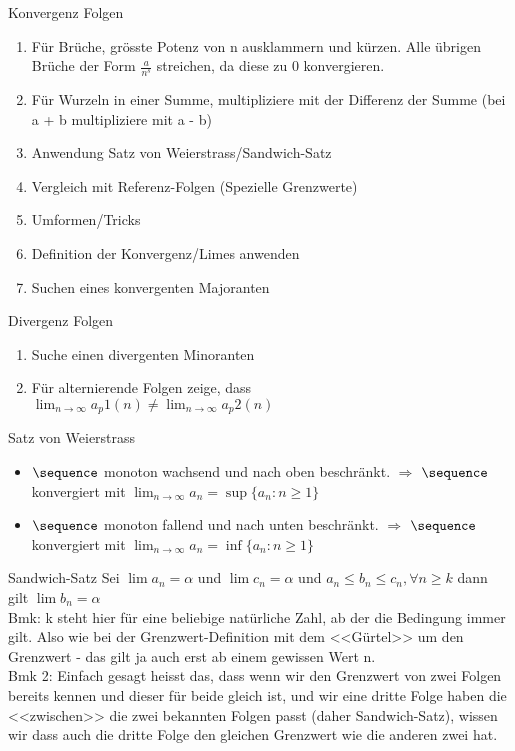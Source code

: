 \begin{KR}{Konvergenz Folgen}
  \begin{enumerate}
    \item Für Brüche, grösste Potenz von n ausklammern und kürzen. Alle übrigen Brüche der Form $\frac{a}{n^s}$ streichen, da diese zu 0 konvergieren.
    \item Für Wurzeln in einer Summe, multipliziere mit der Differenz der Summe (bei a + b multipliziere mit a - b)
    \item Anwendung Satz von Weierstrass/Sandwich-Satz 
    \item Vergleich mit Referenz-Folgen (Spezielle Grenzwerte)
    \item Umformen/Tricks
    \item Definition der Konvergenz/Limes anwenden
    \item Suchen eines konvergenten Majoranten
  \end{enumerate}
\end{KR}

\begin{KR}{Divergenz Folgen}
  \begin{enumerate}
    \item  Suche einen divergenten Minoranten
    \item Für alternierende Folgen zeige, dass \\$\lim_{n \to \infty} a_p1(n) \neq \lim_{n \to \infty} a_p2(n)$
  \end{enumerate}
\end{KR}

\begin{concept}{Satz von Weierstrass}
  \begin{itemize}
    \item $\sequence$ monoton wachsend und nach oben beschränkt. $\Rightarrow$ $\sequence$ konvergiert mit $\lim_{n \to \infty} a_n = \sup \{a_n : n \geq 1\}$
    \item $\sequence$ monoton fallend und nach unten beschränkt. $\Rightarrow$ $\sequence$ konvergiert mit $\lim_{n \to \infty} a_n = \inf \{a_n : n \geq 1\}$
  \end{itemize}
\end{concept}

\begin{theorem}{Sandwich-Satz}
  Sei $\lim a_n = \alpha$ und $\lim c_n = \alpha$ und $a_n \leq b_n \leq c_n, \forall n \geq k$ dann gilt $\lim b_n = \alpha$\\
  Bmk: k steht hier für eine beliebige natürliche Zahl, ab der die Bedingung immer gilt. Also wie bei der Grenzwert-Definition mit dem <<Gürtel>> um den Grenzwert - das gilt ja auch erst ab einem gewissen Wert n.\\
  Bmk 2: Einfach gesagt heisst das, dass wenn wir den Grenzwert von zwei Folgen bereits kennen und dieser für beide gleich ist, und wir eine dritte Folge haben die <<zwischen>> die zwei bekannten Folgen passt (daher Sandwich-Satz), wissen wir dass auch die dritte Folge den gleichen Grenzwert wie die anderen zwei hat.
\end{theorem}    

